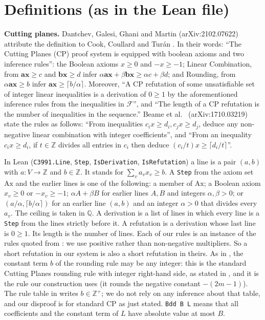 \documentclass[11pt]{article}
\theoremstyle{definition}
\begin{document}
\section{Definitions (as in the Lean file)}

\textbf{Cutting planes.} Dantchev, Galesi, Ghani and Martin \cite{DGGM} (arXiv:2102.07622) attribute the
definition to Cook, Coullard and Tur\'an \cite{CCT}. In their words: ``The Cutting Planes (CP) proof system
is equipped with boolean axioms and two inference rules'': the Boolean axioms $x\ge 0$ and $-x\ge -1$;
Linear Combination, from $\mathbf a\mathbf x\ge c$ and $\mathbf b\mathbf x\ge d$ infer
$\alpha\mathbf a\mathbf x+\beta\mathbf b\mathbf x\ge \alpha c+\beta d$; and Rounding, from
$\alpha\mathbf a\mathbf x\ge b$ infer $\mathbf a\mathbf x\ge\lceil b/\alpha\rceil$. Moreover, ``A CP
refutation of some unsatisfiable set of integer linear inequalities is a derivation of $0\geq 1$ by the
aforementioned inference rules from the inequalities in $\mathcal F$'', and ``The length of a CP
refutation is the number of inequalities in the sequence.'' Beame et al.\ \cite{BFIKPPR}
(arXiv:1710.03219) state the rules as follows: ``From inequalities $c_ix\geq d_i, c_jx\geq d_j$, deduce any
non-negative linear combination with integer coefficients'', and ``From an inequality $c_ix\geq d_i$, if
$t\in\mathbb{Z}$ divides all entries in $c_i$ then deduce $(c_i/t)x\geq\lceil d_i/t\rceil$''.

In Lean (\texttt{C3991.Line}, \texttt{Step}, \texttt{IsDerivation}, \texttt{IsRefutation}) a line is a pair
$(a,b)$ with $a:V\to\mathbb Z$ and $b\in\mathbb Z$. It stands for $\sum_v a_vx_v\ge b$. A \texttt{Step} from
the axiom set $\mathrm{Ax}$ and the earlier lines is one of the following: a member of $\mathrm{Ax}$; a
Boolean axiom $x_v\ge 0$ or $-x_v\ge -1$; $\alpha A+\beta B$ for earlier lines $A,B$ and integers
$\alpha,\beta>0$; or $(a/\alpha,\lceil b/\alpha\rceil)$ for an earlier line $(a,b)$ and an integer $\alpha>0$
that divides every $a_v$. The ceiling is taken in $\mathbb Q$. A derivation is a list of lines in which
every line is a \texttt{Step} from the lines strictly before it. A refutation is a derivation whose last
line is $0\ge 1$. Its length is the number of lines. Each of our rules is an instance of the rules quoted
from \cite{BFIKPPR}: we use positive rather than non-negative multipliers. So a short refutation in our
system is also a short refutation in theirs. As in \cite{BFIKPPR}, the constant term $b$ of the rounding
rule may be any integer: this is the standard Cutting Planes rounding rule with integer right-hand
side, as stated in \cite{BFIKPPR}, and it is the rule our construction uses (it rounds the negative
constant $-(2m-1)$). The rule table in \cite{DGGM} writes $b\in\mathbb Z^+$; we do not rely on any
inference about that table, and our disproof is for standard CP as just stated. \texttt{Bdd B L}
means that all coefficients and the constant term of $L$ have absolute value at most $B$.
\end{document}
